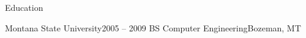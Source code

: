 \section{\faGraduationCap}{Education}

  \resumeEntryStart
    \resumeEntryTSDL
      {Montana State University}{2005 -- 2009}
      {BS Computer Engineering}{Bozeman, MT}
  \resumeEntryEnd
